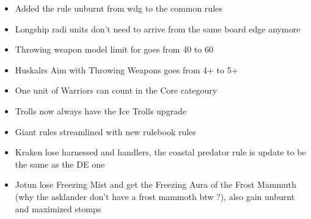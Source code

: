 

\subtitle{2023 beta 1}

\begin{itemize}
	\item Added the rule unburnt from wdg to the common rules
	\item Longship radi units don't need to arrive from the same board edge anymore
	\item Throwing weapon model limit for \asklanders{} goes from 40 to 60
	\item Huskalrs Aim with Throwing Weapons goes from 4+ to 5+
	\item One unit of Warriors can count in the Core categoury
	\item Trolls now always have the Ice Trolls upgrade
	\item Giant rules streamlined with new rulebook rules
	\item Kraken lose harnessed and handlers, the coastal predator rule is update to be the same as the DE one
	\item Jotun lose Freezing Mist and get the Freezing Aura of the Frost Mammuth (why the asklander don't have a frost mammoth btw ?), also gain unburnt and maximized stomps
\end{itemize}


